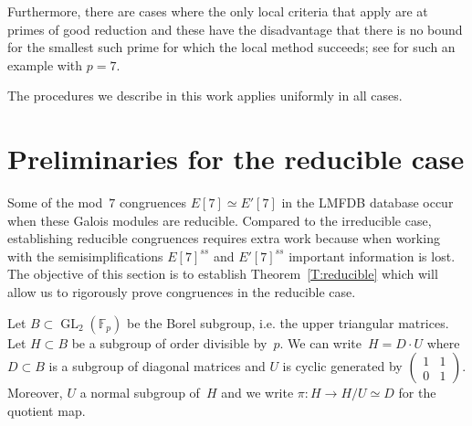 \documentclass[12pt]{amsart}
\newcommand{\F}{\mathbb{F}}
\newcommand{\GL}{\operatorname{GL}}
\numberwithin{equation}{section}
\theoremstyle{definition}
\theoremstyle{remark}
\begin{document}
Furthermore, there are cases where 
the only local criteria that apply are 
at primes of good reduction  and these have the disadvantage that there is no bound for the smallest such prime for which the local method succeeds; 
see \cite[Example~31.2]{FKSym} for such an example with $p=7$.

The procedures we describe in this work applies uniformly in all cases.



\section{Preliminaries for the reducible case}

Some of the mod~$7$ congruences 
$E[7] \simeq E'[7]$ in the LMFDB database occur 
when these Galois modules are reducible. Compared to the irreducible case, establishing reducible congruences requires extra work because when working with the semisimplifications $E[7]^{ss}$ and $E'[7]^{ss}$ important information is lost.
The objective of this section is to establish Theorem~\ref{T:reducible} which will allow us to rigorously prove congruences in the reducible case.


Let $B \subset \GL_2(\F_p)$ be the Borel subgroup, i.e. the upper triangular matrices. Let $H \subset B$ be a subgroup of order divisible by~$p$. 
We can write~$H = D\cdot U$ where $D \subset B$ is a subgroup of diagonal matrices and 
$U$ is cyclic generated by $\left(\begin{smallmatrix}
                            1 & 1 \\
                            0 & 1
                            \end{smallmatrix} \right)$.   
Moreover, $U$ a normal subgroup of~$H$ 
and we write $\pi : H \to H/U \simeq D$ for the quotient map.
\end{document}
